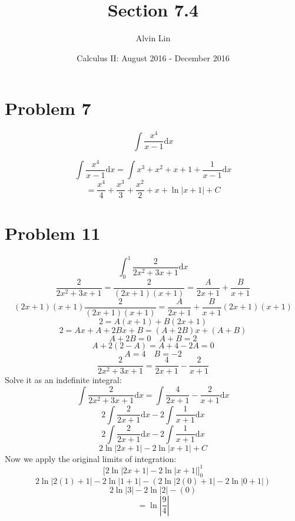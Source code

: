 \documentclass[letterpaper, 12pt]{article}
\title{Section 7.4}
\author{Alvin Lin}
\date{Calculus II: August 2016 - December 2016}
\newcommand*{\diff}{\mathrm{d}}
\begin{document}
\maketitle

\section*{Problem 7}
\[ \int{\frac{x^{4}}{x-1}\diff{x}} \]
\begin{center}
\end{center}
\[ \int{\frac{x^{4}}{x-1}\diff{x}} =
   \int{x^{3}+x^{2}+x+1+\frac{1}{x-1}\diff{x}} \]
\[ = \frac{x^{4}}{4}+\frac{x^{3}}{3}+\frac{x^{2}}{2}+x+\ln|x+1|+C \]

\section*{Problem 11}
\[ \int_{0}^{1}{\frac{2}{2x^{2}+3x+1}\diff{x}} \]
\[ \frac{2}{2x^{2}+3x+1} = \frac{2}{(2x+1)(x+1)} =
   \frac{A}{2x+1}+\frac{B}{x+1} \]
\[ (2x+1)(x+1)\frac{2}{(2x+1)(x+1)} = \frac{A}{2x+1}+\frac{B}{x+1}(2x+1)(x+1) \]
\[ 2 = A(x+1)+B(2x+1) \]
\[ 2 = Ax + A + 2Bx + B = (A+2B)x+(A+B) \]
\[ A+2B = 0 \quad A+B = 2 \]
\[ A+2(2-A) = A+4-2A = 0 \]
\[ A = 4 \quad B = -2 \]
\[ \frac{2}{2x^{2}+3x+1} = \frac{4}{2x+1}-\frac{2}{x+1} \]
Solve it as an indefinite integral:
\[ \int{\frac{2}{2x^{2}+3x+1}\diff{x}} =
   \int{\frac{4}{2x+1}-\frac{2}{x+1}\diff{x}} \]
\[ 2\int{\frac{2}{2x+1}\diff{x}}-2\int{\frac{1}{x+1}\diff{x}} \]
\[ 2\int{\frac{2}{2x+1}\diff{x}}-2\int{\frac{1}{x+1}\diff{x}} \]
\[ 2\ln|2x+1|-2\ln|x+1|+C \]
Now we apply the original limits of integration:
\[ \bigg[2\ln|2x+1|-2\ln|x+1|\bigg]_{0}^{1} \]
\[ 2\ln|2(1)+1|-2\ln|1+1|-(2\ln|2(0)+1|-2\ln|0+1|) \]
\[ 2\ln|3|-2\ln|2|-(0) \]
\[ = \ln|\frac{9}{4}| \]
\end{document}
